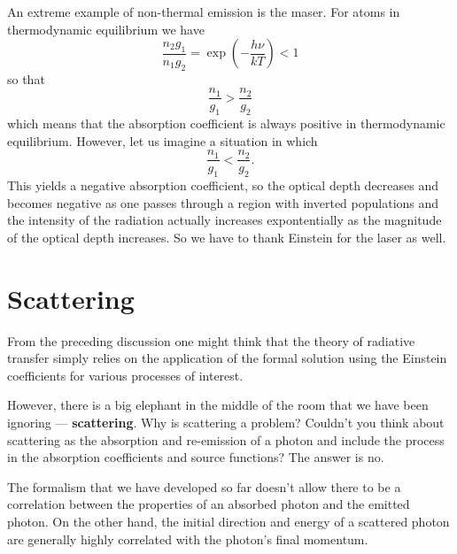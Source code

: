 An extreme example of non-thermal emission is the maser.   For atoms
in thermodynamic equilibrium we have
\begin{equation}
\frac{n_2 g_1}{n_1 g_2} = \exp \left (-\frac{h\nu}{kT} \right ) < 1
\label{eq:83}
\end{equation}
so that 
\begin{equation}
\frac{n_1}{g_1} > \frac{n_2}{g_2}
\label{eq:84}
\end{equation}
which means that the absorption coefficient is always positive in
thermodynamic equilibrium.  However, let us imagine a situation in
which
\begin{equation}
\frac{n_1}{g_1} < \frac{n_2}{g_2}.
\label{eq:85}
\end{equation}
This yields a negative absorption coefficient, so the optical depth
decreases and becomes negative as one passes through a region with
inverted populations and the intensity of the radiation actually
increases expontentially as the magnitude of the optical depth
increases.  So we have to thank Einstein for the laser as well.

\section{Scattering}
\label{sec:scattering}

From the preceding discussion one might think that the theory of
radiative transfer simply relies on the application of the formal
solution using the Einstein coefficients for various processes of
interest.   

However, there is a big elephant in the middle of the room that we
have been ignoring --- {\bf scattering}.  Why is scattering a problem?
Couldn't you think about scattering as the absorption and re-emission
of a photon and include the process in the absorption coefficients and
source functions?  The answer is no.

The formalism that we have developed so far doesn't allow there to be
a correlation between the properties of an absorbed photon and the
emitted photon.  On the other hand, the initial direction and energy
of a scattered photon are generally highly correlated with the
photon's final momentum.  

